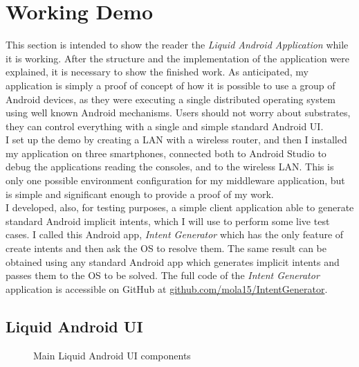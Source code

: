 \section{Working Demo}
This section is intended to show the reader the \textit{Liquid Android Application} while it is working. After the structure and the implementation of the application were explained, it is necessary to show the finished work. As anticipated, my application
is simply a proof of concept of how it is possible to use a group of Android devices, as they were executing a single distributed operating system using well known  Android mechanisms. Users should not worry about substrates, they can control everything with a single and simple standard Android UI.\\
I set up the demo by creating a LAN with a wireless router, and then I installed my application on three smartphones, connected both to Android Studio to debug the applications reading the consoles, and to the wireless LAN. This is only one possible environment configuration for my middleware application, but is simple and significant enough to provide a proof of my work.\\
I developed, also, for testing purposes, a simple client application able to generate standard Android implicit intents, which I will use to perform some live test cases. I called this Android app, \textit{Intent Generator} which has the only feature of create intents and then ask the OS to resolve them. The same result can be obtained using any standard Android app which generates implicit intents and passes them to the OS to be solved. The full code of the \textit{Intent Generator} application is accessible on GitHub at \href{https://github.com/mola15/IntentGenerator}{github.com/mola15/IntentGenerator}.
\subsection{Liquid Android UI}
\begin{figure}[h]
	\centering
	\begin{minipage}{.49\textwidth}\centering
	\end{minipage}
	\begin{minipage}{.49\textwidth}\centering
	\end{minipage}
	\caption{Main Liquid Android UI components}
	\label{fig:5.2}
\end{figure}

